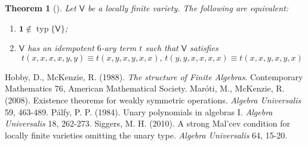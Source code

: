 \documentclass{amsart}
\theoremstyle{plain}
\newtheorem{theorem}{Theorem}[section]
\theoremstyle{definition}
\theoremstyle{remark}
\DeclareMathOperator{\typ}{typ}
\begin{document}
\begin{theorem}
    [\cite{siggers}]
    Let $\mathsf{V}$ be a locally finite variety.
    The following are equivalent: 
    \begin{enumerate}
        \item $\mathbf{1} \notin \typ\{\mathsf{V}\}$; 
        \item $\mathsf{V}$ has an idempotent $6$-ary term $t$ such that $\mathsf{V}$ satisfies 
    \begin{equation*}
        t(x,x,x,x,y,y) \equiv t(x,y,x,y,x,x) \text{, } t(y,y,x,x,x,x) \equiv t(x,x,y,x,y,x)
    \end{equation*}
    \end{enumerate}
\end{theorem}


\begin{center}
\begin{tikzpicture}
\end{tikzpicture}
\end{center} 


\begin{thebibliography}{9}
    Hobby, D., McKenzie, R. (1988). \emph{The structure of Finite Algebras}. Contemporary Mathematics 76, American Mathematical Society.  
    Mar\'oti, M., McKenzie, R. (2008). Existence theorems for weakly symmetric operations. \emph{Algebra Universalis} 59, 463-489.
    P\'alfy, P. P. (1984). Unary polynomials in algebras I. \emph{Algebra Universalis} 18, 262-273.
    Siggers, M. H. (2010). A strong Mal'cev condition for locally finite varieties omitting the unary type. \emph{Algebra Universalis} 64, 15-20.
 \end{thebibliography}
\end{document}
